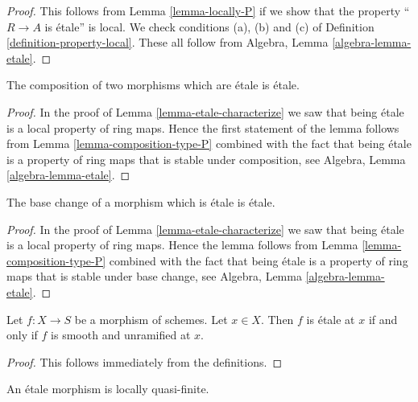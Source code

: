 \begin{proof}
This follows from Lemma \ref{lemma-locally-P} if we show that
the property ``$R \to A$ is \'etale'' is local.
We check conditions (a), (b) and (c) of Definition
\ref{definition-property-local}.
These all follow from Algebra, Lemma \ref{algebra-lemma-etale}.
\end{proof}

\begin{lemma}
\label{lemma-composition-etale}
The composition of two morphisms which are \'etale is \'etale.
\end{lemma}

\begin{proof}
In the proof of Lemma \ref{lemma-etale-characterize}
we saw that being \'etale is a local property of ring maps.
Hence the first statement of the lemma follows from
Lemma \ref{lemma-composition-type-P} combined
with the fact that being \'etale is a property of ring maps that is
stable under composition, see
Algebra, Lemma \ref{algebra-lemma-etale}.
\end{proof}

\begin{lemma}
\label{lemma-base-change-etale}
The base change of a morphism which is \'etale is \'etale.
\end{lemma}

\begin{proof}
In the proof of Lemma \ref{lemma-etale-characterize}
we saw that being \'etale is a local property of ring maps.
Hence the lemma follows from
Lemma \ref{lemma-composition-type-P} combined
with the fact that being \'etale is a property of ring maps that is
stable under base change, see
Algebra, Lemma \ref{algebra-lemma-etale}.
\end{proof}

\begin{lemma}
\label{lemma-etale-smooth-unramified}
Let $f : X \to S$ be a morphism of schemes.
Let $x \in X$. Then $f$ is \'etale at $x$ if and only if $f$ is
smooth and unramified at $x$.
\end{lemma}

\begin{proof}
This follows immediately from the definitions.
\end{proof}

\begin{lemma}
\label{lemma-etale-locally-quasi-finite}
An \'etale morphism is locally quasi-finite.
\end{lemma}

